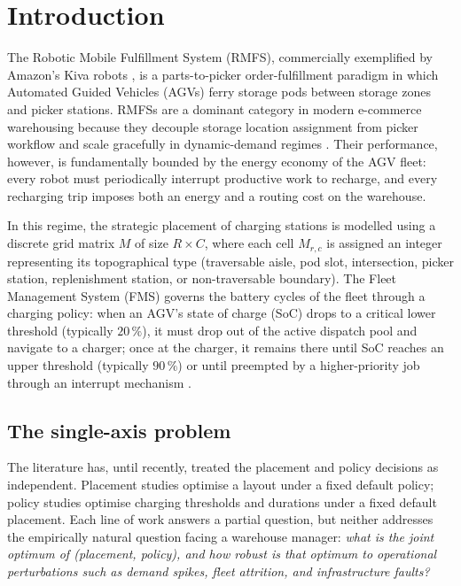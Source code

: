\documentclass[conference]{IEEEtran}
\begin{document}
\section{Introduction}
\label{sec:intro}

The Robotic Mobile Fulfillment System (RMFS), commercially exemplified by Amazon's Kiva robots \cite{wurman2008}, is a parts-to-picker order-fulfillment paradigm in which Automated Guided Vehicles (AGVs) ferry storage pods between storage zones and picker stations. RMFSs are a dominant category in modern e-commerce warehousing because they decouple storage location assignment from picker workflow and scale gracefully in dynamic-demand regimes \cite{boysen2019,lamballais2017}. Their performance, however, is fundamentally bounded by the energy economy of the AGV fleet: every robot must periodically interrupt productive work to recharge, and every recharging trip imposes both an energy and a routing cost on the warehouse.

In this regime, the strategic placement of charging stations is modelled using a discrete grid matrix $M$ of size $R \times C$, where each cell $M_{r,c}$ is assigned an integer representing its topographical type (traversable aisle, pod slot, intersection, picker station, replenishment station, or non-traversable boundary). The Fleet Management System (FMS) governs the battery cycles of the fleet through a charging policy: when an AGV's state of charge (SoC) drops to a critical lower threshold (typically $20\,\%$), it must drop out of the active dispatch pool and navigate to a charger; once at the charger, it remains there until SoC reaches an upper threshold (typically $90\,\%$) or until preempted by a higher-priority job through an interrupt mechanism \cite{bischoff2025}.

\subsection{The single-axis problem}
The literature has, until recently, treated the placement and policy decisions as independent. Placement studies \cite{kundu2023,baras2023} optimise a layout under a fixed default policy; policy studies \cite{bischoff2025,deng2020,lin2023} optimise charging thresholds and durations under a fixed default placement. Each line of work answers a partial question, but neither addresses the empirically natural question facing a warehouse manager: \emph{what is the joint optimum of (placement, policy), and how robust is that optimum to operational perturbations such as demand spikes, fleet attrition, and infrastructure faults?}
\end{document}
